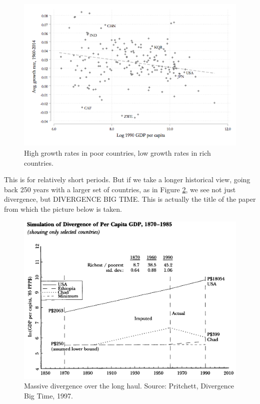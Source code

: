 \documentclass[
]{book}
\begin{document}
\begin{figure}

{\centering \includegraphics[width=1\linewidth]{img/growth/growth9} 

}

\caption{High growth rates in poor countries, low growth rates in rich countries.}\label{fig:growth09}
\end{figure}

This is for relatively short periods. But if we take a longer historical view, going back 250 years with a larger set of countries, as in Figure \ref{fig:growth10}, we see not just divergence, but DIVERGENCE BIG TIME. This is actually the title of the paper from which the picture below is taken.

\begin{figure}

{\centering \includegraphics[width=1\linewidth]{img/growth/growth10} 

}

\caption{Massive divergence over the long haul. Source: Pritchett, Divergence Big Time, 1997.}\label{fig:growth10}
\end{figure}
\end{document}
